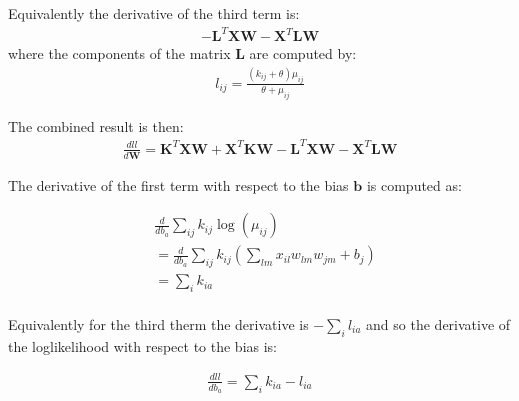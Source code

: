 \documentclass[11pt]{letter}
\newcommand{\matr}[1]{\mathbf{#1}}
\begin{document}
Equivalently the derivative of the third term is:
\begin{align*}
-\matr{L}^T \matr{X} \matr{W} - \matr{X}^T \matr{L} \matr{W}
\end{align*}
where the components of the matrix $\matr{L}$ are computed by:
\begin{align*}
l_{ij} = \frac{(k_{ij} + \theta) \mu_{ij}}{\theta + \mu_{ij}}   
\end{align*}

The combined result is then:
\begin{align*}
\frac{dll}{d\matr{W}} = \matr{K}^T \matr{X} \matr{W} + \matr{X}^T \matr{K} \matr{W} - 
\matr{L}^T \matr{X} \matr{W} - \matr{X}^T \matr{L} \matr{W}
\end{align*}


The derivative of the first term with respect to the bias $\matr{b}$ is computed as:

\begin{align*}
&\frac{d}{db_{a}}\sum_{ij} k_{ij} \log{(\mu_{ij})} \\
&= \frac{d}{db_{a}}\sum_{ij} k_{ij} \left (\sum_{lm} x_{il} w_{lm} w_{jm} + b_j \right) \\
&= \sum_{i} k_{ia}\\
\end{align*}

Equivalently for the third therm the derivative is $-\sum_{i} l_{ia}$ and so the derivative of the loglikelihood with respect to the bias is:

\begin{align*}
\frac{dll}{db_a} = \sum_{i} k_{ia} - l_{ia}\\
\end{align*}
\end{document}
